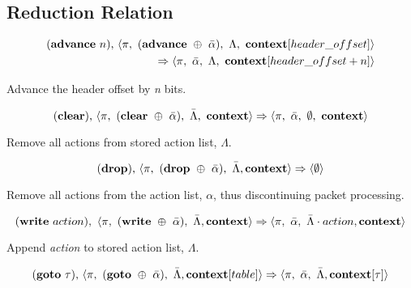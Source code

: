 \subsection{Reduction Relation}
\setlength{\mathindent}{0pt}
\begin{equation}
\begin{split}
  (\textbf{\textrm{advance}} \ n)\textrm{,} \ \langle \pi, \ (\textrm{\textbf{advance}} \ \oplus \ \bar \alpha), \ \Lambda,
  \ \textrm{\textbf{context}}[header\_offset] \rangle \\ \Rightarrow \langle \pi, \ \bar \alpha, \ \Lambda,
  \ \textrm{\textbf{context}}[header\_offset + n] \rangle
\end{split}
\end{equation}

Advance the header offset by \textit{n} bits.

\begin{equation}
  (\textrm{\textbf{clear}}) \textrm{,} \ \langle \pi, \ (\textbf{\textrm{clear}} \ \oplus \ \bar \alpha), \ \bar \Lambda, \ \textrm{\textbf{context}} \rangle
  \Rightarrow \langle \pi, \ \bar \alpha, \ \emptyset, \  \textrm{\textbf{context}} \rangle
\end{equation}

Remove all actions from stored action list, $\Lambda$.

\begin{equation}  
  (\textrm{\textbf{drop})} \textrm{,} \ \langle \pi, \ (\textrm{\textbf{drop}} \ \oplus \ \bar \alpha), \ \bar \Lambda, \textbf{\textrm{context}} \rangle
  \Rightarrow \langle \emptyset \rangle
\end{equation}

Remove all actions from the action list, $\alpha$, thus discontinuing packet processing.

\begin{equation}
  (\textrm{\textbf{write}} \ action), \ \langle \pi, \ (\textrm{\textbf{write}} \ \oplus \ \bar \alpha), \ \bar \Lambda,
  \textrm{\textbf{context}} \rangle \Rightarrow
  \langle \pi, \ \bar \alpha, \ \bar \Lambda \cdot action, \textrm{\textbf{context}} \rangle
\end{equation}

Append \textit{action} to stored action list, $\Lambda$.

\begin{equation}
  (\textrm{\textbf{goto}} \ \tau) \textrm{,} \ \langle \pi, \ (\textrm{\textbf{goto}} \ \oplus \ \bar \alpha), \ \bar \Lambda, \textrm{\textbf{context}}[table] \rangle
  \Rightarrow \langle \pi, \ \bar \alpha, \ \bar \Lambda, \textrm{\textbf{context}}[\tau] \rangle
\end{equation}

